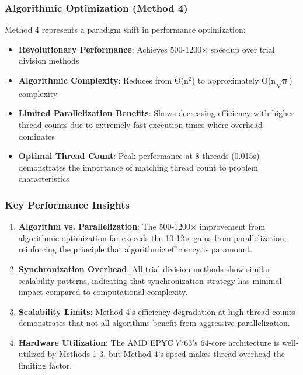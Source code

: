 \documentclass[11pt]{article}
\begin{document}
\subsubsection{Algorithmic Optimization (Method 4)}

Method 4 represents a paradigm shift in performance optimization:

\begin{itemize}
    \item \textbf{Revolutionary Performance}: Achieves 500-1200$\times$ speedup over trial division methods
    \item \textbf{Algorithmic Complexity}: Reduces from O(n$^2$) to approximately O(n$\sqrt{n}$) complexity
    \item \textbf{Limited Parallelization Benefits}: Shows decreasing efficiency with higher thread counts due to extremely fast execution times where overhead dominates
    \item \textbf{Optimal Thread Count}: Peak performance at 8 threads (0.015s) demonstrates the importance of matching thread count to problem characteristics
\end{itemize}

\subsubsection{Key Performance Insights}

\begin{enumerate}
    \item \textbf{Algorithm vs. Parallelization}: The 500-1200$\times$ improvement from algorithmic optimization far exceeds the 10-12$\times$ gains from parallelization, reinforcing the principle that algorithmic efficiency is paramount.
    
    \item \textbf{Synchronization Overhead}: All trial division methods show similar scalability patterns, indicating that synchronization strategy has minimal impact compared to computational complexity.
    
    \item \textbf{Scalability Limits}: Method 4's efficiency degradation at high thread counts demonstrates that not all algorithms benefit from aggressive parallelization.
    
    \item \textbf{Hardware Utilization}: The AMD EPYC 7763's 64-core architecture is well-utilized by Methods 1-3, but Method 4's speed makes thread overhead the limiting factor.
\end{enumerate}
\end{document}
